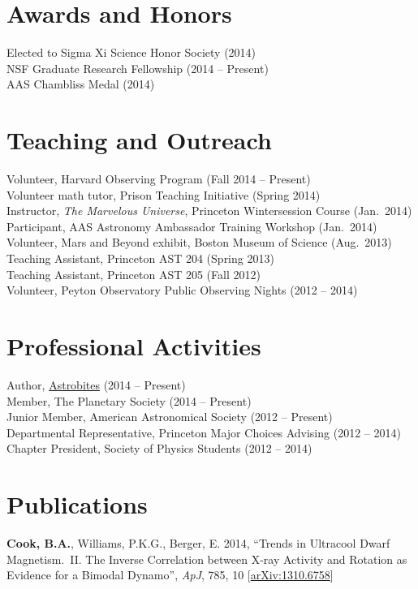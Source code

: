 \documentclass{res}
\begin{document}
\begin{resume}
\section{\textbf{Awards and Honors}}
\vspace{.1in}
Elected to Sigma Xi Science Honor Society (2014)\\
NSF Graduate Research Fellowship (2014 -- Present)\\
AAS Chambliss Medal (2014)


\section{\textbf{Teaching and Outreach}} 
\vspace{.1in}
Volunteer, Harvard Observing Program (Fall 2014 -- Present)\\
Volunteer math tutor, Prison Teaching Initiative (Spring 2014)\\
Instructor, \textit{The Marvelous Universe}, Princeton Wintersession Course (Jan.~2014)\\
Participant, AAS Astronomy Ambassador Training Workshop (Jan.~2014)\\
Volunteer, Mars and Beyond exhibit, Boston Museum of Science (Aug.~2013)\\
Teaching Assistant, Princeton AST 204 (Spring 2013)\\
Teaching Assistant, Princeton AST 205 (Fall 2012)\\
Volunteer, Peyton Observatory Public Observing Nights (2012
-- 2014)

\section{\textbf{Professional Activities}}
\vspace{0.1in}
Author, \href{http://www.astrobites.org}{Astrobites} (2014 -- Present)\\
Member, The Planetary Society (2014 -- Present)\\
Junior Member, American Astronomical Society (2012 -- Present)\\
Departmental Representative, Princeton Major Choices Advising (2012 -- 2014)\\
Chapter President, Society of Physics Students (2012 -- 2014)


\section{\textbf{Publications}}
\vspace{.1in} \textbf{Cook, B.A.}, Williams, P.K.G., Berger, E. 2014,
``Trends in Ultracool Dwarf Magnetism.~II. The Inverse Correlation
between X-ray Activity and Rotation as Evidence for a Bimodal
Dynamo'', \textit{ApJ}, 785, 10
[\href{http://arxiv.org/abs/1310.6758}{arXiv:1310.6758}]


\end{resume}
\end{document}
